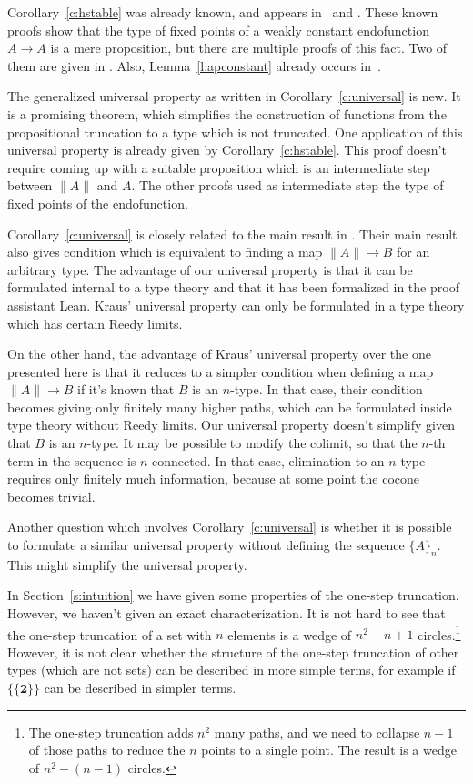 \documentclass[square]{sigplanconf}
\newcommand{\bool}{\ensuremath{\mathbf{2}}}
\theoremstyle{definition}
\theoremstyle{remark}
\begin{document}
Corollary~\ref{c:hstable} was already known, and appears in~\cite[Theorem 3]{kraus2013hedberg} and
\cite[Theorem 4.5]{Kraus2014anonymousexistence}. These known proofs show that the type of fixed
points of a weakly constant endofunction $A \to A$ is a mere proposition, but there are multiple
proofs of this fact. Two of them are given in \cite[Lemma 4.1]{Kraus2014anonymousexistence}. Also, Lemma~\ref{l:apconstant} already occurs in~\cite[Proposition 3]{kraus2013hedberg}.

The generalized universal property as written in Corollary~\ref{c:universal} is new. It is a
promising theorem, which simplifies the construction of functions from the propositional truncation
to a type which is not truncated. One application of this universal property is already given by
Corollary~\ref{c:hstable}. This proof doesn't require coming up with a suitable proposition which is
an intermediate step between $\|A\|$ and $A$. The other proofs used as intermediate step the type of
fixed points of the endofunction.

Corollary~\ref{c:universal} is closely related to the main result in
\cite{Kraus2014UniversalProperty}. Their main result also gives condition which is equivalent to
finding a map $\|A\|\to B$ for an arbitrary type. The advantage of our universal property is that it
can be formulated internal to a type theory and that it has been formalized in the proof assistant
Lean. Kraus' universal property can only be formulated in a type theory which has certain Reedy
limits.

On the other hand, the advantage of Kraus' universal property over the one presented here is that it
reduces to a simpler condition when defining a map $\|A\|\to B$ if it's known that $B$ is an
$n$-type. In that case, their condition becomes giving only finitely many higher paths, which can be
formulated inside type theory without Reedy limits. Our universal property doesn't simplify given
that $B$ is an $n$-type. It may be possible to modify the colimit, so that the $n$-th term in the
sequence is $n$-connected. In that case, elimination to an $n$-type requires only finitely much
information, because at some point the cocone becomes trivial.

Another question which involves Corollary~\ref{c:universal} is whether it is possible to formulate a
similar universal property without defining the sequence $\{A\}_n$. This might simplify the
universal property.

In Section~\ref{s:intuition} we have given some properties of the one-step truncation. However, we
haven't given an exact characterization. It is not hard to see that the one-step truncation of a set
with $n$ elements is a wedge of $n^2-n+1$ circles.\footnote{The one-step truncation adds $n^2$ many
  paths, and we need to collapse $n-1$ of those paths to reduce the $n$ points to a single
  point. The result is a wedge of $n^2-(n-1)$ circles.} However, it is not clear whether the
structure of the one-step truncation of other types (which are not sets) can be described in more
simple terms, for example if $\{\{\bool\}\}$ can be described in simpler terms.
\end{document}
